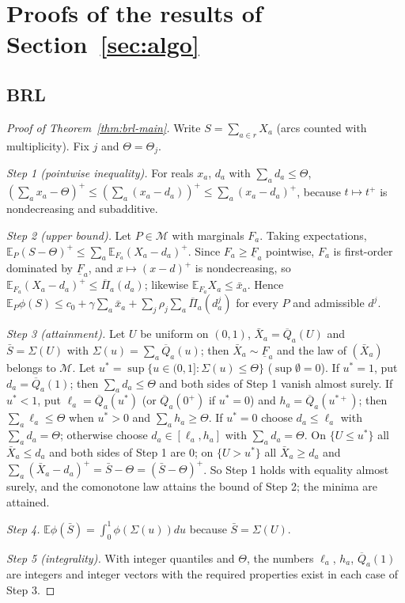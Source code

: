 \documentclass[preprint,12pt]{elsarticle}
\theoremstyle{definition}
\theoremstyle{remark}
\newcommand{\E}{\mathbb{E}}
\newcommand{\cM}{\mathcal{M}}
\newcommand{\Qb}{\overline{Q}}
\newcommand{\Fl}{\underline{F}}
\newcommand{\Pib}{\overline{\Pi}}
\newcommand{\xb}{\bar x}
\newcommand{\pos}[1]{\left(#1\right)^{+}}
\begin{document}
\section{Proofs of the results of Section~\ref{sec:algo}}\label{app:brl}

\subsection{BRL}

\begin{proof}[Proof of Theorem~\ref{thm:brl-main}]
Write $S=\sum_{a\in r}X_a$ (arcs counted with multiplicity). Fix $j$ and $\Theta=\Theta_j$.

\emph{Step 1 (pointwise inequality).} For reals $x_a$, $d_a$ with $\sum_ad_a\le\Theta$, $\pos{\sum_ax_a-\Theta}\le\pos{\sum_a(x_a-d_a)}\le\sum_a\pos{x_a-d_a}$, because $t\mapsto t^+$ is nondecreasing and subadditive.

\emph{Step 2 (upper bound).} Let $P\in\cM$ with marginals $F_a$. Taking expectations, $\E_P\pos{S-\Theta}\le\sum_a\E_{F_a}\pos{X_a-d_a}$. Since $F_a\ge\Fl_a$ pointwise, $F_a$ is first-order dominated by $\Fl_a$, and $x\mapsto\pos{x-d}$ is nondecreasing, so $\E_{F_a}\pos{X_a-d_a}\le\Pib_a(d_a)$; likewise $\E_{F_a}X_a\le\xb_a$. Hence $\E_P\phi(S)\le c_0+\gamma\sum_a\xb_a+\sum_j\rho_j\sum_a\Pib_a(d^j_a)$ for every $P$ and admissible $d^j$.

\emph{Step 3 (attainment).} Let $U$ be uniform on $(0,1)$, $\bar X_a=\Qb_a(U)$ and $\bar S=\Sigma(U)$ with $\Sigma(u)=\sum_a\Qb_a(u)$; then $\bar X_a\sim\Fl_a$ and the law of $(\bar X_a)$ belongs to $\cM$. Let $u^*=\sup\{u\in(0,1]:\Sigma(u)\le\Theta\}$ ($\sup\emptyset=0$). If $u^*=1$, put $d_a=\Qb_a(1)$; then $\sum_ad_a\le\Theta$ and both sides of Step 1 vanish almost surely. If $u^*<1$, put $\ell_a=\Qb_a(u^*)$ (or $\Qb_a(0^+)$ if $u^*=0$) and $h_a=\Qb_a(u^{*+})$; then $\sum_a\ell_a\le\Theta$ when $u^*>0$ and $\sum_ah_a\ge\Theta$. If $u^*=0$ choose $d_a\le\ell_a$ with $\sum_ad_a=\Theta$; otherwise choose $d_a\in[\ell_a,h_a]$ with $\sum_ad_a=\Theta$. On $\{U\le u^*\}$ all $\bar X_a\le d_a$ and both sides of Step 1 are $0$; on $\{U>u^*\}$ all $\bar X_a\ge d_a$ and $\sum_a\pos{\bar X_a-d_a}=\bar S-\Theta=\pos{\bar S-\Theta}$. So Step 1 holds with equality almost surely, and the comonotone law attains the bound of Step 2; the minima are attained.

\emph{Step 4.} $\E\phi(\bar S)=\int_0^1\phi(\Sigma(u))du$ because $\bar S=\Sigma(U)$.

\emph{Step 5 (integrality).} With integer quantiles and $\Theta$, the numbers $\ell_a$, $h_a$, $\Qb_a(1)$ are integers and integer vectors with the required properties exist in each case of Step 3.
\end{proof}
\end{document}
